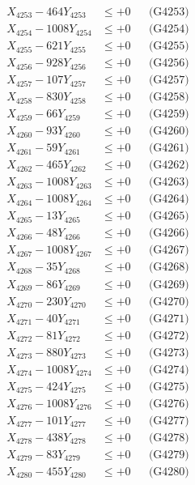 \documentclass[a4paper,10pt]{article}
\begin{document}
{\begin{align}
X_{4253} - 464Y_{4253} &\leq +0 && \text{(G4253)} \\
X_{4254} - 1008Y_{4254} &\leq +0 && \text{(G4254)} \\
X_{4255} - 621Y_{4255} &\leq +0 && \text{(G4255)} \\
X_{4256} - 928Y_{4256} &\leq +0 && \text{(G4256)} \\
X_{4257} - 107Y_{4257} &\leq +0 && \text{(G4257)} \\
X_{4258} - 830Y_{4258} &\leq +0 && \text{(G4258)} \\
X_{4259} - 66Y_{4259} &\leq +0 && \text{(G4259)} \\
X_{4260} - 93Y_{4260} &\leq +0 && \text{(G4260)} \\
\allowbreak
X_{4261} - 59Y_{4261} &\leq +0 && \text{(G4261)} \\
X_{4262} - 465Y_{4262} &\leq +0 && \text{(G4262)} \\
X_{4263} - 1008Y_{4263} &\leq +0 && \text{(G4263)} \\
X_{4264} - 1008Y_{4264} &\leq +0 && \text{(G4264)} \\
X_{4265} - 13Y_{4265} &\leq +0 && \text{(G4265)} \\
X_{4266} - 48Y_{4266} &\leq +0 && \text{(G4266)} \\
X_{4267} - 1008Y_{4267} &\leq +0 && \text{(G4267)} \\
X_{4268} - 35Y_{4268} &\leq +0 && \text{(G4268)} \\
X_{4269} - 86Y_{4269} &\leq +0 && \text{(G4269)} \\
X_{4270} - 230Y_{4270} &\leq +0 && \text{(G4270)} \\
\allowbreak
X_{4271} - 40Y_{4271} &\leq +0 && \text{(G4271)} \\
X_{4272} - 81Y_{4272} &\leq +0 && \text{(G4272)} \\
X_{4273} - 880Y_{4273} &\leq +0 && \text{(G4273)} \\
X_{4274} - 1008Y_{4274} &\leq +0 && \text{(G4274)} \\
X_{4275} - 424Y_{4275} &\leq +0 && \text{(G4275)} \\
X_{4276} - 1008Y_{4276} &\leq +0 && \text{(G4276)} \\
X_{4277} - 101Y_{4277} &\leq +0 && \text{(G4277)} \\
X_{4278} - 438Y_{4278} &\leq +0 && \text{(G4278)} \\
X_{4279} - 83Y_{4279} &\leq +0 && \text{(G4279)} \\
X_{4280} - 455Y_{4280} &\leq +0 && \text{(G4280)} \\

\end{align}}
\end{document}
